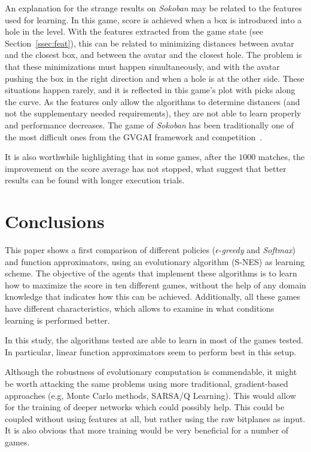 \documentclass[conference]{IEEEtran}
\begin{document}
An explanation for the strange results on \textit{Sokoban} may be related to the features used for learning. In this game, score is achieved when a box is introduced into a hole in the level. With the features extracted from the game state (see Section~\ref{ssec:feat}), this can be related to minimizing distances between avatar and the closest box, and between the avatar and the closest hole. The problem is that these minimizations must happen simultaneously, and with the avatar pushing the box in the right direction and when a hole is at the other side. These situations happen rarely, and it is reflected in this game's plot with picks along the curve. As the features only allow the algorithms to determine distances (and not the supplementary needed requirements), they are not able to learn properly and performance decreases. The game of \textit{Sokoban} has been traditionally one of the most difficult ones from the GVGAI framework and competition~\cite{Perez2015}.

It is also worthwhile highlighting that in some games, after the $1000$ matches, the improvement on the score average has not stopped, what suggest that better results can be found with longer execution trials.


\section{Conclusions} \label{sec:conc}

This paper shows a first comparison of different policies ($\epsilon$-\textit{greedy} and \textit{Softmax}) and function approximators, using an evolutionary algorithm (S-NES) as learning scheme. The objective of the agents that implement these algorithms is to learn how to maximize the score in ten different games, without the help of any domain knowledge that indicates how this can be achieved. Additionally, all these games have different characteristics, which allows to examine in what conditions learning is performed better.

In this study, the algorithms tested are able to learn in most of the games tested. In particular, linear function approximators seem to perform best in this setup. 

Although the robustness of evolutionary computation is commendable, it might be worth attacking the same problems using more traditional, gradient-based approaches (e.g, Monte Carlo methods, SARSA/Q Learning). This would allow for the training of deeper networks which could possibly help. This could be coupled without using features at all, but rather using the raw bitplanes as input. It is also obvious that more training would be very beneficial for a number of games. 
\end{document}

